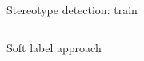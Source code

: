 \begin{frame}{Stereotype detection: train}
{\begin{columns}
            \centering
            Soft label approach
            
        \end{columns}
    }


\end{frame}

